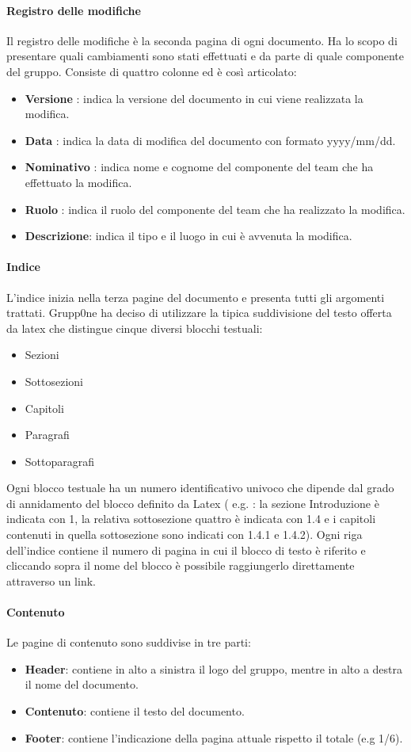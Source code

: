\documentclass[../norme-di-progetto.tex]{subfiles}
\begin{document}
\paragraph{Registro delle modifiche}
\label{par:registro delle modifiche}
Il registro delle modifiche è la seconda pagina di ogni documento. Ha lo scopo di presentare quali cambiamenti sono stati effettuati e da parte di quale componente del gruppo. Consiste di quattro colonne ed è così articolato:
\begin{itemize}
	\item \textbf{Versione} : indica la versione del documento in cui viene realizzata la modifica.
	\item \textbf{Data} : indica la data di modifica del documento con formato yyyy/mm/dd.
	\item \textbf{Nominativo} : indica nome e cognome del componente del team che ha effettuato la modifica.
	\item \textbf{Ruolo} : indica il ruolo del componente del team che ha realizzato la modifica.
	\item \textbf{Descrizione}: indica il tipo e il luogo in cui è avvenuta la modifica.
\end{itemize}
\paragraph{Indice}
\label{par:indice}
L'indice inizia nella terza pagine del documento e presenta tutti gli argomenti trattati. Grupp0ne ha deciso di utilizzare la tipica suddivisione del testo offerta da latex che distingue cinque diversi blocchi testuali:
\begin{itemize}
	\item Sezioni
	\item Sottosezioni
	\item Capitoli
	\item Paragrafi
	\item Sottoparagrafi 
\end{itemize}
Ogni blocco testuale ha un numero identificativo univoco che dipende dal grado di annidamento del blocco definito da Latex ( e.g. : la sezione Introduzione è indicata con 1, la relativa sottosezione quattro è indicata con 1.4 e i capitoli contenuti in quella sottosezione sono indicati con 1.4.1 e 1.4.2).
\newline Ogni riga dell'indice contiene il numero di pagina in cui il blocco di testo è riferito e cliccando sopra il nome del blocco è possibile raggiungerlo direttamente attraverso un link.
\paragraph{Contenuto}
\label{par:contenuto}
Le pagine di contenuto sono suddivise in tre parti:
\begin{itemize}
	\item \textbf{Header}: contiene in alto a sinistra il logo del gruppo, mentre in alto a destra il nome del documento.
	\item \textbf{Contenuto}: contiene il testo del documento.
	\item \textbf{Footer}: contiene l'indicazione della pagina attuale rispetto il totale (e.g 1/6).
\end{itemize}
\end{document}
